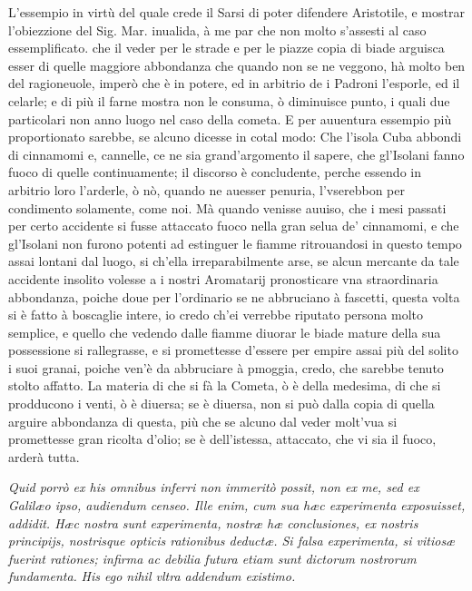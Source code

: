 \documentclass[11pt,twoside,openany]{book}
\begin{document}
L'essempio in virtù del quale crede il Sarsi di poter difendere Aristotile, e mostrar l'obiezzione del Sig. Mar. inualida, à me par che non molto s'assesti al caso essemplificato. che il veder per le strade e per le piazze copia di biade arguisca esser di quelle maggiore abbondanza che quando non se ne veggono, hà molto ben del ragioneuole, imperò che è in potere, ed in arbitrio de i Padroni l'esporle, ed il celarle; e di più il farne mostra non le consuma, ò diminuisce punto, i quali due particolari non anno luogo nel caso della cometa. E per auuentura essempio più proportionato sarebbe, se alcuno dicesse in cotal modo: Che l'isola Cuba abbondi di cinnamomi e, cannelle, ce ne sia grand'argomento il sapere, che gl'Isolani fanno fuoco di quelle continuamente; il discorso è concludente, perche essendo in arbitrio loro l'arderle, ò nò, quando ne auesser penuria, l'vserebbon per condimento solamente, come noi. Mà quando venisse auuiso, che i mesi passati per certo accidente si fusse attaccato fuoco nella gran selua de' cinnamomi, e che gl'Isolani non furono potenti ad estinguer le fiamme ritrouandosi in questo tempo assai lontani dal luogo, si ch'ella irreparabilmente arse, se alcun mercante da tale accidente insolito volesse a i nostri Aromatarij pronosticare vna straordinaria abbondanza, poiche doue per l'ordinario se ne abbruciano à fascetti, questa volta si è fatto à boscaglie intere, io credo ch'ei verrebbe riputato persona molto semplice, e quello che vedendo dalle fiamme diuorar le biade mature della sua possessione si rallegrasse, e si promettesse d'essere per empire assai più del solito i suoi granai, poiche ven'è da abbruciare à pmoggia, credo, che sarebbe tenuto stolto affatto. La materia di che si fà la Cometa, ò è della medesima, di che si prodducono i venti, ò è diuersa; se è diuersa, non si può dalla copia di quella arguire abbondanza di questa, più che se alcuno dal veder molt'vua si promettesse gran ricolta d'olio; se è dell'istessa, attaccato, che vi sia il fuoco, arderà tutta.



\par\bigskip\noindent{}\enspace \textit{Quid porrò ex his omnibus inferri non immeritò possit, non ex me, sed ex Galilæo ipso, audiendum censeo. Ille enim, cum sua hæc experimenta exposuisset, addidit. Hæc nostra sunt experimenta, nostræ hæ conclusiones, ex nostris principijs, nostrisque opticis rationibus deductæ. Si falsa experimenta, si vitiosæ fuerint rationes; infirma ac debilia futura etiam sunt dictorum nostrorum fundamenta}\textit{. }\textit{His ego nihil vltra addendum existimo.}
\end{document}
